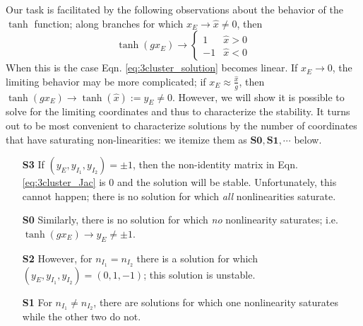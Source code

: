 \documentclass[11pt,reqno]{amsart}
\begin{document}
Our task is facilitated by the following observations about the behavior of the $\tanh$ function; along branches for which $x_E \rightarrow \hat{x} \not= 0$, then
\[ \tanh(gx_E) \rightarrow \left\{ \begin{matrix}
    1 & \hat{x} > 0\\
    -1 & \hat{x} < 0
\end{matrix} \right.
\] 
When this is the case Eqn. \eqref{eq:3cluster_solution} becomes linear.
If $x_E \rightarrow 0$, the limiting behavior may be more complicated; if $x_E \approx \frac{\hat{x}}{g}$, then $\tanh(gx_E) \rightarrow \tanh(\hat{x}) := y_E \not= 0$.  However, we will show it is possible to solve for the limiting coordinates and thus to characterize the stability. It turns out to be most convenient to characterize solutions by the number of coordinates that have saturating non-linearities: we itemize them as $\textbf{S0}, \textbf{S1}, \cdots$ below.

\begin{enumerate}
    \item[\textbf{S3}] If $(y_E,y_{I_1},y_{I_2}) = \pm 1$, then the non-identity matrix in Eqn. \eqref{eq:3cluster_Jac} is 0 and the solution will be stable. Unfortunately, this cannot happen; there is no solution for which \textit{all} nonlinearities saturate.
    \item[\textbf{S0}] Similarly, there is no solution for which \textit{no} nonlinearity saturates; i.e. $\tanh(g x_E) \rightarrow y_E \not= \pm 1$.
    \item[\textbf{S2}] However, for $n_{I_1} = n_{I_2}$ there is a solution for which $(y_E,y_{I_1},y_{I_2}) = (0,1,-1)$; this solution is unstable. 
    \item[\textbf{S1}] For $n_{I_1}\not=n_{I_2}$, there are solutions for which one nonlinearity saturates while the other two do not.
\end{enumerate}
\end{document}
